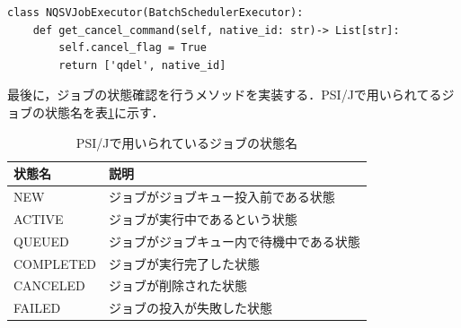 \begin{lstlisting}[caption=ジョブの削除メソッド, label=cancel]
class NQSVJobExecutor(BatchSchedulerExecutor):    
    def get_cancel_command(self, native_id: str)-> List[str]:
        self.cancel_flag = True
        return ['qdel', native_id]
\end{lstlisting}

最後に，ジョブの状態確認を行うメソッドを実装する．PSI/Jで用いられてるジョブの状態名を表\ref{PSIJstatus}に示す．\par

\begin{table}[tb]
    \centering
    \caption{PSI/Jで用いられているジョブの状態名}
    \begin{tabular}{|l|l|}
    \hline
    状態名       & 説明                  \\ \hline
    NEW       & ジョブがジョブキュー投入前である状態     \\ \hline
    ACTIVE    & ジョブが実行中であるという状態     \\ \hline
    QUEUED    & ジョブがジョブキュー内で待機中である状態 \\ \hline
    COMPLETED & ジョブが実行完了した状態        \\ \hline
    CANCELED  & ジョブが削除された状態         \\ \hline
    FAILED    & ジョブの投入が失敗した状態       \\ \hline
    \end{tabular}
    \label{PSIJstatus}
\end{table}

